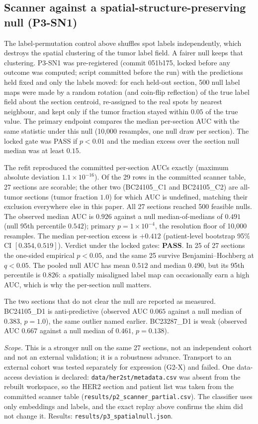 \documentclass[11pt]{article}
\begin{document}
\subsection{Scanner against a spatial-structure-preserving null (P3-SN1)}\label{sec:p3sn1}
The label-permutation control above shuffles spot labels independently, which
destroys the spatial clustering of the tumor label field. A fairer null keeps
that clustering. P3-SN1 was pre-registered (commit 051b175, locked before any
outcome was computed; script committed before the run) with the predictions held
fixed and only the labels moved: for each held-out section, 500 null label maps
were made by a random rotation (and coin-flip reflection) of the true label
field about the section centroid, re-assigned to the real spots by nearest
neighbour, and kept only if the tumor fraction stayed within $0.05$ of the true
value. The primary endpoint compares the median per-section AUC with the same
statistic under this null (10{,}000 resamples, one null draw per section). The
locked gate was PASS if $p<0.01$ and the median excess over the section null
median was at least $0.15$.

The refit reproduced the committed per-section AUCs exactly (maximum absolute
deviation $1.1\times10^{-16}$). Of the 29 rows in the committed scanner table,
27 sections are scorable; the other two (BC24105\_C1 and BC24105\_C2) are
all-tumor sections (tumor fraction $1.0$) for which AUC is undefined, matching
their exclusion everywhere else in this paper. All 27 sections reached 500
feasible nulls. The observed median AUC is $0.926$ against a null
median-of-medians of $0.491$ (null 95th percentile $0.542$); primary
$p=1\times10^{-4}$, the resolution floor of 10{,}000 resamples. The median
per-section excess is $+0.412$ (patient-level bootstrap 95\% CI $[0.354,
0.519]$). Verdict under the locked gates: \textbf{PASS}. In 25 of 27 sections
the one-sided empirical $p<0.05$, and the same 25 survive Benjamini--Hochberg
at $q<0.05$. The pooled null AUC has mean $0.512$ and median $0.490$, but its
95th percentile is $0.826$: a spatially misaligned label map can occasionally
earn a high AUC, which is why the per-section null matters.

The two sections that do not clear the null are reported as measured.
BC24105\_D1 is anti-predictive (observed AUC $0.065$ against a null median of
$0.383$, $p=1.0$), the same outlier named earlier. BC23287\_D1 is weak (observed
AUC $0.667$ against a null median of $0.461$, $p=0.138$).

\emph{Scope.} This is a stronger null on the same 27 sections, not an
independent cohort and not an external validation; it is a robustness advance.
Transport to an external cohort was tested separately for expression (G2-X) and
failed. One data-access deviation is declared: \texttt{data/her2st/metadata.csv}
was absent from the rebuilt workspace, so the HER2 section and patient list was
taken from the committed scanner table (\texttt{results/p2\_scanner\_partial.csv}).
The classifier uses only embeddings and labels, and the exact replay above
confirms the shim did not change it. Results: \texttt{results/p3\_spatialnull.json}.
\end{document}

